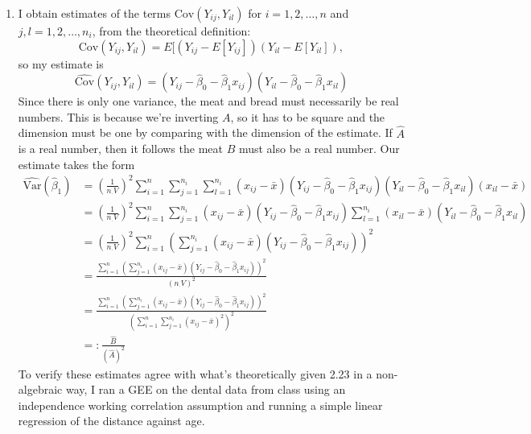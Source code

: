 \documentclass[11pt]{article}
\newcommand{\Var}{\mathrm{Var}}
\newcommand{\Cov}{\mathrm{Cov}}
\begin{document}
\begin{enumerate}
\begin{enumerate}
			\item I obtain estimates of the terms $\Cov(Y_{ij},Y_{il})$ for $i=1,2,\dotsc,n$ and $j,l=1,2,\dotsc,n_i$, from the theoretical definition:
			 \[
			 	\Cov(Y_{ij},Y_{il}) = E[(Y_{ij} - E[Y_{ij}])(Y_{il} - E[Y_{il}]),
			 \]
			 so my estimate is
			 \[
			 	\widehat{\Cov}(Y_{ij},Y_{il}) = (Y_{ij}-\widehat{\beta}_0 - \widehat{\beta}_1x_{ij})(Y_{il}-\widehat{\beta}_0 - \widehat{\beta}_1x_{il})
			 \]
			 Since there is only one variance, the meat and bread must necessarily be real numbers. This is because we're inverting $A$, so it has to be square and the dimension must be one by comparing with the dimension of the estimate. If $\widehat{A}$ is a real number, then it follows the meat $B$ must also be a real number. Our estimate takes the form
			 \begin{align*}
			 	\widehat{\Var}(\widehat{\beta}_1) &= \left(\frac{1}{n_\cdot V}\right)^2\sum_{i=1}^n \sum_{j=1}^{n_i}\sum_{l=1}^{n_i} (x_{ij}-\bar{x})(Y_{ij}-\widehat{\beta}_0 - \widehat{\beta}_1x_{ij})(Y_{il}-\widehat{\beta}_0 - \widehat{\beta}_1x_{il})(x_{il}-\bar{x}) \\
			 	&= \left(\frac{1}{n_\cdot V}\right)^2\sum_{i=1}^n \sum_{j=1}^{n_i}(x_{ij}-\bar{x})(Y_{ij}-\widehat{\beta}_0 - \widehat{\beta}_1x_{ij})\sum_{l=1}^{n_i}(x_{il}-\bar{x})(Y_{il}-\widehat{\beta}_0 - \widehat{\beta}_1x_{il}) \\
			 	&=  \left(\frac{1}{n_\cdot V}\right)^2\sum_{i=1}^n \left(\sum_{j=1}^{n_i}(x_{ij}-\bar{x})(Y_{ij}-\widehat{\beta}_0 - \widehat{\beta}_1x_{ij})\right)^2 \\
			 	&= \frac{\sum_{i=1}^n \left(\sum_{j=1}^{n_i}(x_{ij}-\bar{x})(Y_{ij}-\widehat{\beta}_0 - \widehat{\beta}_1x_{ij})\right)^2}{(n_\cdot V)^2} \\
			 	&= \frac{\sum_{i=1}^n \left(\sum_{j=1}^{n_i}(x_{ij}-\bar{x})(Y_{ij}-\widehat{\beta}_0 - \widehat{\beta}_1x_{ij})\right)^2}{(\sum_{i=1}^n\sum_{j=1}^{n_i}(x_{ij}-\bar{x})^2)^2} \\
			 	&=: \frac{\widehat{B}}{(\widehat{A})^2}
			 \end{align*}
			To verify these estimates agree with what's theoretically given 2.23 in a non-algebraic way, I ran a GEE on the dental data from class using an independence working correlation assumption and running a simple linear regression of the distance against age.
		\end{enumerate}
	

\end{enumerate}
\end{document}
